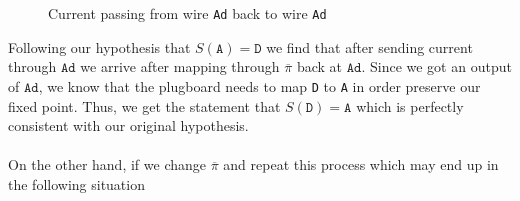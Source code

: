 \begin{figure}[H]
\begin{minipage}{0.45\textwidth}
  \end{minipage}
  \caption{Current passing from wire \texttt{Ad} back to wire \texttt{Ad}}
  \label{fig:correct_stecker}
\end{figure}
\noindent Following our hypothesis that $S(\texttt{A}) = \texttt{D}$
we find that after sending
current through $\texttt{Ad}$ we arrive after mapping through
$\overline\pi$ back at $\texttt{Ad}$. Since we got an output of
$\texttt{Ad}$, we know that the plugboard needs to map \texttt{D} to
\texttt{A} in order preserve our fixed point. Thus, we
get the statement that $S(\texttt{D}) = \texttt{A}$ which is
perfectly consistent with our original hypothesis.
\\\\On the other hand, if we change
$\overline\pi$ and repeat this process which may end up in the
following situation
